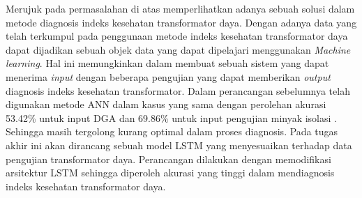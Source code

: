 Merujuk pada permasalahan di atas memperlihatkan adanya sebuah solusi dalam metode diagnosis indeks kesehatan transformator daya. Dengan adanya data yang telah terkumpul pada penggunaan metode indeks kesehatan transformator daya dapat dijadikan sebuah objek data yang dapat dipelajari menggunakan \textit{Machine learning}. Hal ini memungkinkan dalam membuat sebuah sistem yang dapat menerima \textit{input} dengan beberapa pengujian yang dapat memberikan \textit{output} diagnosis indeks kesehatan transformator. Dalam perancangan sebelumnya telah digunakan metode ANN dalam kasus yang sama dengan perolehan akurasi 53.42\% untuk input DGA dan 69.86\% untuk input pengujian minyak isolasi \cite{sutaryono2015analisa}. Sehingga masih tergolong kurang optimal dalam proses diagnosis. Pada tugas akhir ini akan dirancang sebuah model LSTM yang menyesuaikan terhadap data pengujian transformator daya. Perancangan dilakukan dengan memodifikasi arsitektur LSTM sehingga diperoleh akurasi yang tinggi dalam mendiagnosis indeks kesehatan transformator daya. 


 



